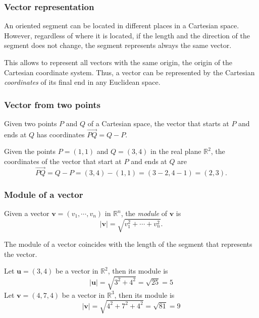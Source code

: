 \begin{frame}
\frametitle{Vector representation}
An oriented segment can be located in different places in a Cartesian space.  
However, regardless of where it is located, if the length and the direction of the segment does not change, the segment represents always the same vector. 

This allows to represent all vectors with the same origin, the origin of the Cartesian coordinate system.
Thus, a vector can be represented by the Cartesian \emph{coordinates} of its final end in any Euclidean space.

\begin{center}

\end{center}
\end{frame}


\begin{frame}
\frametitle{Vector from two points}
Given two points $P$ and $Q$ of a Cartesian space, the vector that starts at $P$ and ends at $Q$ has coordinates 
$\vec{PQ}=Q-P$.

 Given the points $P=(1,1)$ and $Q=(3,4)$ in the real plane $\mathbb{R}^2$, the coordinates of the vector that start at $P$ and ends at $Q$ are
\[
\vec{PQ} = Q-P = (3,4)-(1,1) = (3-2,4-1) = (2,3).
\]
\begin{center}

\end{center}
\end{frame}


\begin{frame}
\frametitle{Module of a vector}
\begin{definition}
Given a vector $\mathbf{v}=(v_1,\cdots,v_n)$ in $\mathbb{R}^n$, the \emph{module} of $\mathbf{v}$ is
\[
|\mathbf{v}| = \sqrt{v_1^2+ \cdots + v_n^2}.
\]
\end{definition}
The module of a vector coincides with the length of the segment that represents the vector.

Let $\mathbf{u}=(3,4)$ be a vector in $\mathbb{R}^2$, then its module is
\[
|\mathbf{u}| = \sqrt{3^2+4^2} = \sqrt{25} = 5
\]
Let $\mathbf{v}=(4,7,4)$ be a vector in $\mathbb{R}^3$, then its module is
\[
|\mathbf{v}| = \sqrt{4^2+7^2+4^2} = \sqrt{81} = 9
\]
\end{frame}



